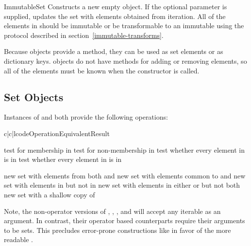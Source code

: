 \begin{classdesc}{ImmutableSet}{}
Constructs a new empty  object.  If the optional
 parameter is supplied, updates the set with elements obtained
from iteration.  All of the elements in  should be immutable or
be transformable to an immutable using the protocol described in
section~\ref{immutable-transforms}.

Because  objects provide a  method,
they can be used as set elements or as dictionary keys.  
objects do not have methods for adding or removing elements, so all of the
elements must be known when the constructor is called.
\end{classdesc}


\subsection{Set Objects \label{set-objects}}

Instances of  and  both provide
the following operations:

\begin{tableiii}{c|c|l}{code}{Operation}{Equivalent}{Result}

  \hline
         {test  for membership in }
         {test  for non-membership in }
         {test whether every element in  is in }
         {test whether every element in  is in }

  \hline
         {new set with elements from both  and }
         {new set with elements common to  and }
         {new set with elements in  but not in }
         {new set with elements in either  or  but not both}
         {new set with a shallow copy of }
\end{tableiii}

Note, the non-operator versions of ,
, , and
 will accept any iterable as an argument.
In contrast, their operator based counterparts require their arguments to
be sets.  This precludes error-prone constructions like
 in favor of the more readable
.

